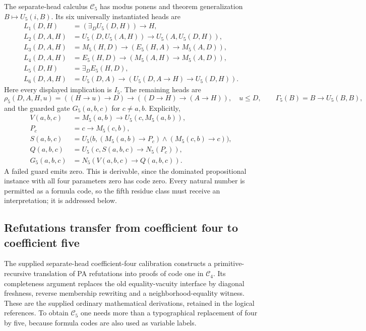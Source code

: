 The separate-head calculus $\mathcal C_5$ has modus ponens and theorem
generalization $B\mapsto U_5(i,B)$. Its six universally instantiated heads
are
\[
\begin{aligned}
 L_1(D,H)&=(\exists_D U_5(D,H))\to H,\\
 L_2(D,A,H)&=U_5(D,U_5(A,H))\to U_5(A,U_5(D,H)),\\
 L_3(D,A,H)&=M_5(H,D)\to(E_5(H,A)\to M_5(A,D)),\\
 L_4(D,A,H)&=E_5(H,D)\to(M_5(A,H)\to M_5(A,D)),\\
 L_5(D,H)&=\exists_D E_5(H,D),\\
 L_6(D,A,H)&=U_5(D,A)\to(U_5(D,A\to H)\to U_5(D,H)).
\end{aligned}
\]
Here every displayed implication is $I_5$. The remaining heads are
\[
 \rho_5(D,A,H,u)=((H\to u)\to D)\to((D\to H)\to(A\to H)),
 \quad u\le D,
 \qquad \Gamma_5(B)=B\to U_5(B,B),
\]
and the guarded gate $G_5(a,b,c)$ for $c\ne a,b$. Explicitly,
\[
\begin{aligned}
 V(a,b,c)&=M_5(a,b)\to U_5(c,M_5(a,b)),\\
 P_c&=c\to M_5(c,b),\\
 S(a,b,c)&=U_5\bigl(b,(M_5(a,b)\to P_c)\wedge(M_5(c,b)\to c)\bigr),\\
 Q(a,b,c)&=U_5(c,S(a,b,c)\to N_5(P_c)),\\
 G_5(a,b,c)&=N_5(V(a,b,c)\to Q(a,b,c)).
\end{aligned}
\]
A failed guard emits zero. This is derivable, since the dominated
propositional instance with all four parameters zero has code zero.
Every natural number is permitted as a formula code, so the fifth residue
class must receive an interpretation; it is addressed below.

\subsection{Refutations transfer from coefficient four to coefficient five}

The supplied separate-head coefficient-four calibration constructs a
primitive-recursive translation of PA refutations into proofs of code one
in $\mathcal C_4$. Its completeness argument replaces the old
equality-vacuity interface by diagonal freshness, reverse membership
rewriting and a neighborhood-equality witness. These are the supplied
ordinary mathematical derivations, retained in the logical references.
To obtain $\mathcal C_5$ one needs more than a typographical replacement of
four by five, because formula codes are also used as variable labels.

